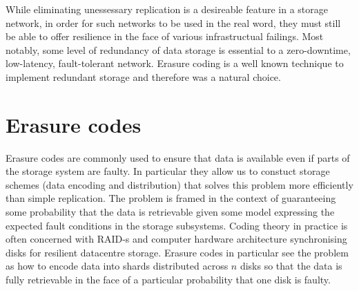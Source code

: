 \documentclass[12pt]{article}
\begin{document}
While eliminating unessessary replication is a desireable feature in a storage network, in order for such networks to be used in the real word, they must still be able to offer resilience in the face of various infrastructual failings. Most notably, some level of redundancy of data storage is essential to a zero-downtime, low-latency, fault-tolerant network. Erasure coding is a well known technique to implement redundant storage and therefore was a natural choice.

\section{Erasure codes}

Erasure codes are commonly used to ensure that data is available even if parts of the storage system are faulty. In particular they allow us to constuct storage schemes (data encoding and distribution) that solves this problem more efficiently than simple replication.  The problem is framed in the context of guaranteeing some probability that the data is retrievable given some model expressing the expected fault conditions in the storage subsystems.
Coding theory in practice is often concerned with RAID-s and computer hardware architecture synchronising disks for resilient datacentre storage.
Erasure codes in particular see the problem as how to encode data into shards distributed across $n$ disks so that the data is fully retrievable in the face of a particular probability that one disk is faulty.
\end{document}
